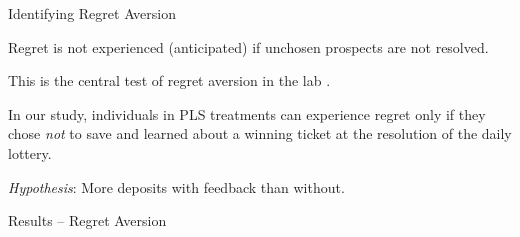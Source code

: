 \documentclass[aspectratio=169]{beamer}
\newenvironment{wideitemize}{\itemize\addtolength{\itemsep}{10pt}}{\enditemize}
\begin{document}
\begin{frame}{Identifying Regret Aversion}

	\begin{wideitemize}

		\item Regret is not experienced (anticipated) if unchosen prospects are not resolved.

		\item This is the central test of regret aversion in the lab \parencite{filiz-ozbay_auctions_2007,zeelenberg_consequences_2004,zeelenberg_consequences_1996}.

		\item In our study, individuals in PLS treatments can experience regret only if they chose \textit{not} to save and learned about a winning ticket at the resolution of the daily lottery.


		\item \textit{Hypothesis}: More deposits with feedback than without.

	\end{wideitemize}

	
\end{frame}

\begin{frame}{Results -- Regret Aversion}

	

\end{frame}
\end{document}
